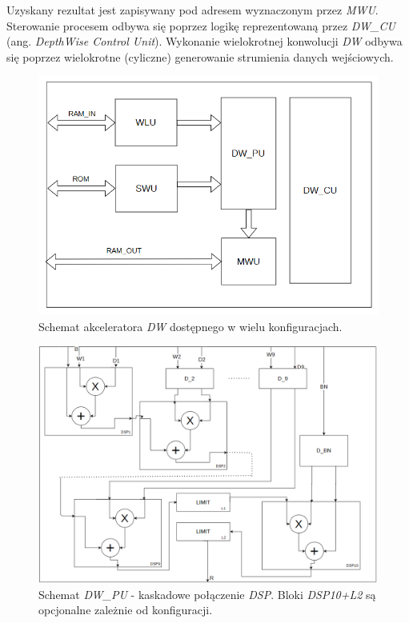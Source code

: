 Uzyskany rezultat jest zapisywany pod adresem wyznaczonym przez \emph{MWU}.
Sterowanie procesem odbywa się poprzez logikę reprezentowaną przez \emph{DW\_CU} (ang. \emph{DepthWise Control Unit}).
Wykonanie wielokrotnej konwolucji \emph{DW} odbywa się poprzez wielokrotne (cyliczne) generowanie strumienia danych wejściowych.
\begin{figure}
    \centering
    \includegraphics[width=0.9\linewidth]{images/DWACC.png}
    \caption{Schemat akceleratora \emph{DW} dostępnego w wielu konfiguracjach.}
    \label{fig:dwacc}
\end{figure}
\begin{figure}
    \centering
    \includegraphics[width=0.9\linewidth]{images/DW_PU.png}
    \caption{Schemat \emph{DW\_PU} - kaskadowe połączenie \emph{DSP}.
    Bloki \emph{DSP10+L2} są opcjonalne zależnie od konfiguracji.}
    \label{fig:dwpu}
\end{figure}

